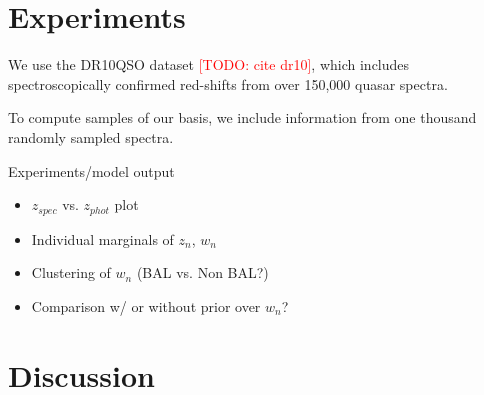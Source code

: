 \documentclass{article}
\newcommand{\red}[1]{\textcolor{red}{[TODO: #1]}}
\begin{document}
\section{Experiments}
\label{sec:experiments}
We use the DR10QSO dataset \red{cite dr10}, which includes spectroscopically confirmed red-shifts from over 150,000 quasar spectra.  

To compute samples of our basis, we include information from one thousand randomly sampled spectra. 

Experiments/model output
\begin{itemize}
\item $z_{spec}$ vs. $z_{phot}$ plot 
\item Individual marginals of $z_n$, $w_n$
\item Clustering of $w_n$ (BAL vs. Non BAL?)
\item Comparison w/ or without prior over $w_n$?
\end{itemize}


\section{Discussion}



 






\end{document}
